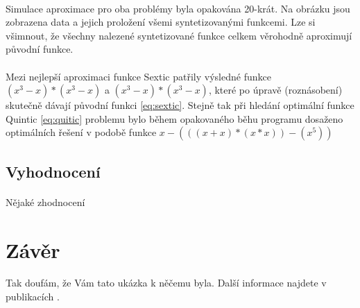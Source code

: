 \documentclass[bc,male,java,dept460]{diploma}		%
\begin{document}




\paragraph*{}
Simulace aproximace pro oba problémy byla opakována 20-krát. Na obrázku jsou zobrazena data a jejich proložení všemi syntetizovanými funkcemi. Lze si všimnout, že všechny nalezené syntetizované funkce celkem věrohodně aproximují původní funkce.

\paragraph*{}
Mezi nejlepší aproximaci funkce Sextic patřily výsledné funkce $(x^3-x)*(x^3-x)$ a $(x^3-x)*(x^3-x)$, které po úpravě (roznásobení) skutečně dávají původní funkci \ref{eq:sextic}.
Stejně tak při hledání optimální funkce Quintic \ref{eq:quitic} problemu bylo během opakovaného běhu programu dosaženo optimálních řešení v podobě funkce $x-(((x+x)*(x*x))-(x^5))$




\subsection{Vyhodnocení}
\paragraph*{}
Nějaké zhodnocení

\section{Závěr}
\label{sec:Conclusion}
Tak doufám, že Vám tato ukázka k něčemu byla. Další informace najdete v publikacích
\cite{goossens94,lamport94}.
\end{document}
